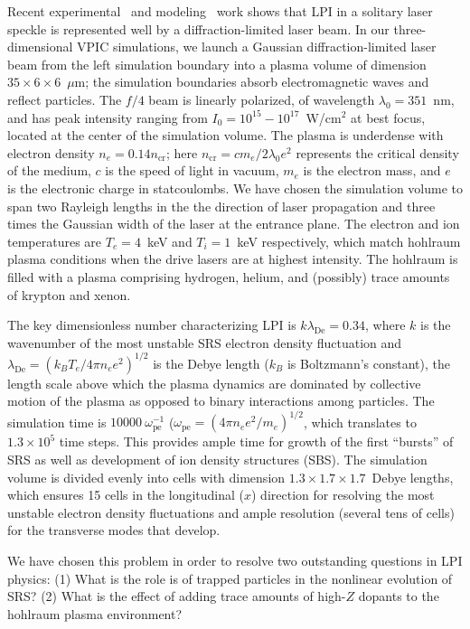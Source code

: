 \documentclass[letter,10pt]{article}
\newcommand{\lde}      {\lambda_{\mathrm{De}}}
\newcommand{\wpe}      {\omega_{\mathrm{pe}}}
\begin{document}
Recent experimental~\cite{} and modeling~\cite{} work shows that LPI
in a solitary laser speckle is represented well by a diffraction-limited laser beam.  
In our three-dimensional VPIC simulations, we launch a Gaussian diffraction-limited 
laser beam from the left simulation boundary into a plasma volume of dimension 
$35 \times 6 \times 6$~$\mu$m; the simulation boundaries absorb
electromagnetic waves and reflect particles.  
The $f/4$ beam is linearly polarized, of wavelength 
$\lambda_0 = 351$~nm,  
and has peak intensity ranging from $I_0 = 10^{15} - 10^{17}$~W/cm$^2$ at best 
focus, located at the center of the simulation volume.  The plasma is underdense 
with electron density $n_e = 0.14 n_{\mathrm{cr}}$; here 
$n_{\mathrm{cr}} = c m_e / 2 \lambda_0 e^2$ represents the critical 
density of the medium, $c$ is the speed of light in vacuum, $m_e$ is the electron
mass, and $e$ is the electronic charge in statcoulombs.  
We have chosen the simulation volume to span two Rayleigh lengths in the
the direction of laser propagation and three times the Gaussian width of the laser 
at the entrance plane.  The electron and ion temperatures are 
$T_e = 4$~keV and $T_i = 1$~keV respectively, which match hohlraum plasma conditions 
when the drive lasers are at highest intensity.  The hohlraum is filled with a plasma
comprising hydrogen, helium, and (possibly) trace amounts of krypton and xenon. 

The key dimensionless number characterizing LPI is $k \lde = 0.34$, where $k$ is 
the wavenumber of the most unstable SRS electron density fluctuation and 
$\lde = (k_B T_e / 4 \pi n_e e^2)^{1/2}$ is the Debye length ($k_B$ is Boltzmann's 
constant), the length scale above which 
the plasma dynamics are dominated by collective motion of the plasma as opposed to 
binary interactions among particles.  
The simulation time is $10000~\wpe^{-1}$ ($\wpe = (4 \pi n_e e^2 / m_e)^{1/2}$, which 
translates to $1.3 \times 10^5$ time steps.  This provides ample time for growth of the
first ``bursts'' of SRS as well as development of ion density structures (SBS).  
The simulation volume is divided evenly into cells with dimension 
$1.3 \times 1.7 \times 1.7$~Debye lengths, which ensures 15 cells in the longitudinal 
($x$) direction for resolving the most unstable electron density fluctuations and ample 
resolution (several tens of cells) for the transverse modes that develop.  

We have chosen this problem in order to resolve two outstanding questions in LPI 
physics:  (1) What is the role is of trapped particles in the nonlinear evolution of
SRS?  (2) What is the effect of adding trace amounts of high-$Z$ dopants to the 
hohlraum plasma environment?  
\end{document}
